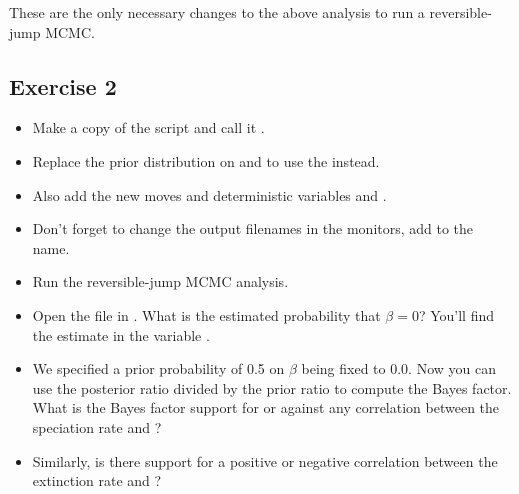 These are the only necessary changes to the above analysis to run a reversible-jump MCMC.

\subsection{Exercise 2}

\begin{itemize}
\item Make a copy of the script  and call it .
\item Replace the prior distribution on  and  to use the  instead.
\item Also add the new moves  and deterministic variables   and .
\item Don't forget to change the output filenames in the monitors, \EG add  to the name.
\item Run the reversible-jump MCMC analysis.
\item Open the file  in \Tracer. What is the estimated probability that $\beta=0$? You'll find the estimate in the variable .
\item We specified a prior probability of 0.5 on $\beta$ being fixed to 0.0. Now you can use the posterior ratio divided by the prior ratio to compute the Bayes factor. What is the Bayes factor support for or against any correlation between the speciation rate and \COO?
\item Similarly, is there support for a positive or negative correlation between the extinction rate and \COO?
\end{itemize}



